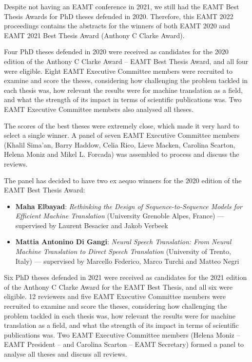 \documentclass[a4paper,11pt,twoside]{book}
\begin{document}
\begin{onehalfspacing}

Despite not having an EAMT conference in 2021, we still had the EAMT Best Thesis Awards for PhD theses defended in 2020. Therefore, this EAMT 2022 proceedings contains the abstracts for the winners of both EAMT 2020 and EAMT 2021 Best Thesis Award (Anthony C Clarke Award). 

Four PhD theses defended in 2020 were received as candidates for the 2020 edition of the Anthony C Clarke Award – EAMT Best Thesis Award, and all four were eligible. Eight EAMT Executive Committee members were recruited to examine and score the theses, considering how challenging the problem tackled in each thesis was, how relevant the results were for machine translation as a field, and what the strength of its impact in terms of scientific publications was. Two EAMT Executive Committee members also analysed all theses.

The scores of the best theses were extremely close, which made it very hard to select a single winner. A panel of seven EAMT Executive Committee members (Khalil Sima'an, Barry Haddow, Celia Rico, Lieve Macken, Carolina Scarton, Helena Moniz and Mikel L. Forcada) was assembled to process and discuss the reviews.

The panel has decided to have two ex aequo winners for the 2020 edition of the EAMT Best Thesis Award:

\begin{itemize}
    \item \textbf{Maha Elbayad}: \textit{Rethinking the Design of Sequence-to-Sequence Models for Efficient Machine Translation} (University Grenoble Alpes, France) — supervised by Laurent Besacier and Jakob Verbeek
    \item \textbf{Mattia Antonino Di Gangi}: \textit{Neural Speech Translation: From Neural Machine Translation to Direct Speech Translation} (University of Trento, Italy) — supervised by Marcello Federico, Marco Turchi and Matteo Negri
\end{itemize}

Six PhD theses defended in 2021 were received as candidates for the 2021 edition of the Anthony C Clarke Award for the EAMT Best Thesis, and all six were eligible. 12 reviewers and five EAMT Executive Committee members were recruited to examine and score the theses, considering how challenging the problem tackled in each thesis was, how relevant the results were for machine translation as a field, and what the strength of its impact in terms of scientific publications was. Two EAMT Executive Committee members (Helena Moniz – EAMT President – and Carolina Scarton – EAMT Secretary) formed a panel to analyse all theses and discuss all reviews.


\end{onehalfspacing}
\end{document}
